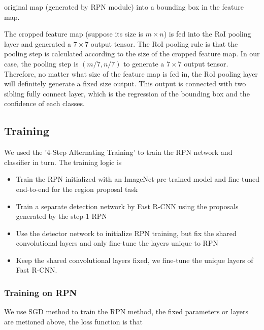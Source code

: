 \documentclass{IEEEtran}
\begin{document}
original map (generated by RPN module) into a bounding box in the feature map.

The cropped feature map (suppose its size is $m \times n$) is fed into the RoI pooling layer and generated a 
$7\times7$ output tensor. 
The RoI pooling rule is that the pooling step is calculated according to the size of the cropped feature map. In 
our case, the pooling 
step is $(m/7,n/7)$ to generate a $7\times7$ output tensor. Therefore, no matter what size of the feature map is 
fed in, the RoI pooling 
layer will definitely generate a fixed size output. This output is connected with two sibling fully connect layer, 
which is the 
regression of the bounding box and the confidence of each classes.

\subsection{Training}
We used the '4-Step Alternating Training' to train the RPN network and classifier in turn. The training logic is
\begin{itemize}
    \item {Train the RPN initialized with an ImageNet-pre-trained model and ﬁne-tuned end-to-end for the region proposal task}
    \item {Train a separate detection network by Fast R-CNN using the proposals generated by the step-1 RPN}
    \item {Use the detector network to initialize RPN training, but ﬁx the shared convolutional layers and only ﬁne-tune the layers unique to RPN}
    \item {Keep the shared convolutional layers ﬁxed, we ﬁne-tune the unique layers of Fast R-CNN.}
\end{itemize}
\subsubsection{Training on RPN}
We use SGD method to train the RPN method, the fixed parameters or layers are metioned above, the loss function is that
\end{document}
